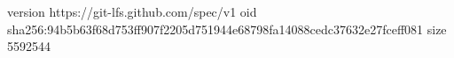 version https://git-lfs.github.com/spec/v1
oid sha256:94b5b63f68d753ff907f2205d751944e68798fa14088cedc37632e27fceff081
size 5592544
